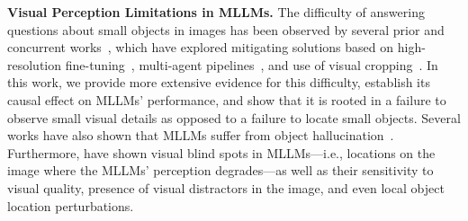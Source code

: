 \textbf{Visual Perception Limitations in MLLMs.} The difficulty of answering questions about small objects in images has been observed by several prior and concurrent works~\citep{vicrop1,perlim,liu2024llavanext,v-star}, which have explored mitigating solutions based on high-resolution fine-tuning~\citep{liu2024llavanext,navit,qwen2vl}, multi-agent pipelines~\citep{v-star}, and use of visual cropping~\citep{vicrop1}. In this work, we provide more extensive evidence for this difficulty, establish its causal effect on MLLMs' performance, and show that it is rooted in a failure to observe small visual details as opposed to a failure to locate small objects. Several works have also shown that MLLMs suffer from object hallucination~\citep{li2023pope,rlhfv}. Furthermore, \citet{perlim} have shown visual blind spots in MLLMs---i.e., locations on the image where the MLLMs' perception degrades---as well as their sensitivity to visual quality, presence of visual distractors in the image, and even local object location perturbations.